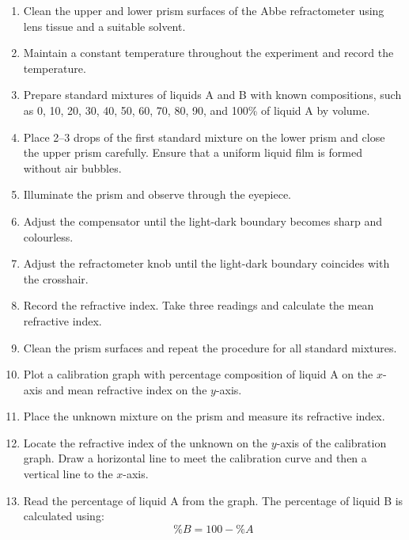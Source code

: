 \documentclass[12pt]{article}
\begin{document}
	\begin{enumerate}
		\item Clean the upper and lower prism surfaces of the Abbe refractometer using lens tissue and a suitable solvent.
		
		\item Maintain a constant temperature throughout the experiment and record the temperature.
		
		\item Prepare standard mixtures of liquids A and B with known compositions, such as 0, 10, 20, 30, 40, 50, 60, 70, 80, 90, and 100\% of liquid A by volume.
		
		\item Place 2--3 drops of the first standard mixture on the lower prism and close the upper prism carefully. Ensure that a uniform liquid film is formed without air bubbles.
		
		\item Illuminate the prism and observe through the eyepiece.
		
		\item Adjust the compensator until the light-dark boundary becomes sharp and colourless.
		
		\item Adjust the refractometer knob until the light-dark boundary coincides with the crosshair.
		
		\item Record the refractive index. Take three readings and calculate the mean refractive index.
		
		\item Clean the prism surfaces and repeat the procedure for all standard mixtures.
		
		\item Plot a calibration graph with percentage composition of liquid A on the \(x\)-axis and mean refractive index on the \(y\)-axis.
		
		\item Place the unknown mixture on the prism and measure its refractive index.
		
		\item Locate the refractive index of the unknown on the \(y\)-axis of the calibration graph. Draw a horizontal line to meet the calibration curve and then a vertical line to the \(x\)-axis.
		
		\item Read the percentage of liquid A from the graph. The percentage of liquid B is calculated using:
		\[
		\%B = 100 - \%A
		\]
	\end{enumerate}
	
\end{document}
